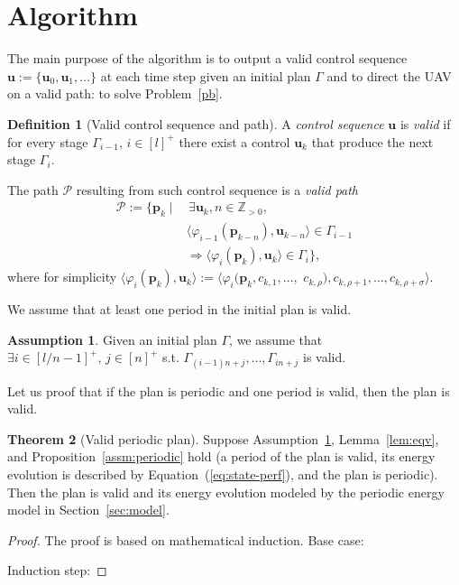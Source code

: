 \documentclass[letterpaper,10pt,conference]{ieeeconf}
\theoremstyle{definition}
\newtheorem{thm}{Theorem}[section]
\newtheorem{assm}[thm]{Assumption}
\newtheorem{defn}{Definition}[section]
\begin{document}
\section{Algorithm}
\label{sec:algo}

The main purpose of the algorithm is to output a valid control sequence $\mathbf{u}:=\{\mathbf{u}_0,\mathbf{u}_1,\dots\}$ at each time step given an initial plan $\Gamma$ and to direct the UAV on a valid path: to solve Problem~\ref{pb}.

\begin{defn}[Valid control sequence and path]\label{def:valid}
  A \emph{control sequence} $\mathbf{u}$ is \emph{valid} if for every stage $\Gamma_{i-1},\,i\in[l]^+$ there exist a control $\mathbf{u}_k$ that produce the next stage $\Gamma_i$. 
  
  The path $\mathcal{P}$ resulting from such control sequence is a \emph{valid path}
  \begin{equation*}\begin{split}\label{eq:mission-valid}
   \mathcal{P}:=\{\mathbf{p}_k\mid&\,\exists \mathbf{u}_k,n\in\mathbb{Z}_{>0},\\
    &\langle\varphi_{i-1}\left(\mathbf{p}_{k-n}\right),\mathbf{u}_{k-n}\rangle\in\Gamma_{i-1}\\
    &\Longrightarrow\langle\varphi_i(\mathbf{p}_{k}),\mathbf{u}_k\rangle\in\Gamma_i\},
  \end{split}\end{equation*}
  where for simplicity $\langle\varphi_i(\mathbf{p}_{k}),\mathbf{u}_k\rangle:=\langle\varphi_i(\mathbf{p}_{k},c_{k,1},\dots,$ $c_{k,\rho}),c_{k,\rho+1},\dots,c_{k,\rho+\sigma}\rangle$.
\end{defn}

We assume that at least one period in the initial plan is valid.

\begin{assm}\label{assm:valid}
  Given an initial plan $\Gamma$, we assume that $\exists i\in[l/n-1]^+,\,j\in[n]^+$ s.t. $\Gamma_{(i-1)n+j},\dots,\Gamma_{in+j}$ is valid.
\end{assm}

Let us proof that if the plan is periodic and one period is valid, then the plan is valid.

\begin{thm}[Valid periodic plan]\label{thm:state-vs-energy}  
  Suppose Assumption~\ref{assm:valid}, Lemma~\ref{lem:eqv}, and Proposition~\ref{assm:periodic} hold (a period of the plan is valid, its energy evolution is described by Equation~(\ref{eq:state-perf}), and the plan is periodic). Then the plan is valid and its energy evolution modeled by the periodic energy model in Section~\ref{sec:model}.
\end{thm}
\begin{proof}
  The proof is based on mathematical induction. 
  Base case: 
  
  Induction step:

\end{proof}
\end{document}
